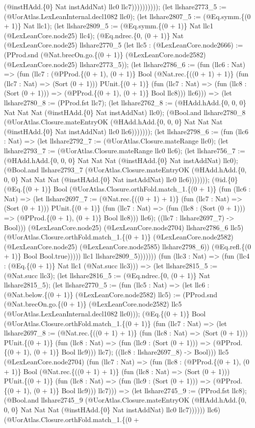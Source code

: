 \documentclass[11pt]{article}
\begin{document}
(@instHAdd.\{0\} Nat instAddNat) llc0 llc7)))))))))); (let llshare2773\_5 := (@UorAtlas.LexLeanInternal.decl1082 llc0); (let llshare2807\_5 := (@Eq.symm.\{(0 + 1)\} Nat llc1); (let llshare2809\_5 := (@Eq.symm.\{(0 + 1)\} Nat llc1 (@LexLeanCore.node25) llc4); (@Eq.ndrec.\{0, (0 + 1)\} Nat (@LexLeanCore.node25) llshare2770\_5 (let llc5 : (@LexLeanCore.node2666) := (PProd.snd (@Nat.brecOn.go.\{(0 + 1)\} (@LexLeanCore.node2582) (@LexLeanCore.node25) llshare2773\_5)); (let llshare2786\_6 := (fun (llc6 : Nat) => (fun (llc7 : (@PProd.\{(0 + 1), (0 + 1)\} Bool (@Nat.rec.\{((0 + 1) + 1)\} (fun (llc7 : Nat) => (Sort (0 + 1))) PUnit.\{(0 + 1)\} (fun (llc7 : Nat) => (fun (llc8 : (Sort (0 + 1))) => (@PProd.\{(0 + 1), (0 + 1)\} Bool llc8))) llc6))) => (let llshare2780\_8 := (PProd.fst llc7); (let llshare2762\_8 := (@HAdd.hAdd.\{0, 0, 0\} Nat Nat Nat (@instHAdd.\{0\} Nat instAddNat) llc0); (@Bool.and llshare2780\_8 (@UorAtlas.Closure.mateEntryOK (@HAdd.hAdd.\{0, 0, 0\} Nat Nat Nat (@instHAdd.\{0\} Nat instAddNat) llc0 llc6))))))); (let llshare2798\_6 := (fun (llc6 : Nat) => (let llshare2792\_7 := (@UorAtlas.Closure.mateRange llc0); (let llshare2793\_7 := (@UorAtlas.Closure.mateRange llc0 llc6); (let llshare756\_7 := (@HAdd.hAdd.\{0, 0, 0\} Nat Nat Nat (@instHAdd.\{0\} Nat instAddNat) llc0); (@Bool.and llshare2793\_7 (@UorAtlas.Closure.mateEntryOK (@HAdd.hAdd.\{0, 0, 0\} Nat Nat Nat (@instHAdd.\{0\} Nat instAddNat) llc0 llc6))))))); (@id.\{0\} (@Eq.\{(0 + 1)\} Bool (@UorAtlas.Closure.orthFold.match\_1.\{(0 + 1)\} (fun (llc6 : Nat) => (let llshare2697\_7 := (@Nat.rec.\{((0 + 1) + 1)\} (fun (llc7 : Nat) => (Sort (0 + 1))) PUnit.\{(0 + 1)\} (fun (llc7 : Nat) => (fun (llc8 : (Sort (0 + 1))) => (@PProd.\{(0 + 1), (0 + 1)\} Bool llc8))) llc6); ((llc7 : llshare2697\_7) -> Bool))) (@LexLeanCore.node25) (@LexLeanCore.node2704) llshare2786\_6 llc5) (@UorAtlas.Closure.orthFold.match\_1.\{(0 + 1)\} (@LexLeanCore.node2582) (@LexLeanCore.node25) (@LexLeanCore.node2585) llshare2798\_6)) (@Eq.refl.\{(0 + 1)\} Bool Bool.true))))) llc1 llshare2809\_5))))))) (fun (llc3 : Nat) => (fun (llc4 : (@Eq.\{(0 + 1)\} Nat llc1 (@Nat.succ llc3))) => (let llshare2815\_5 := (@Nat.succ llc3); (let llshare2816\_5 := (@Eq.ndrec.\{0, (0 + 1)\} Nat llshare2815\_5); (let llshare2770\_5 := (fun (llc5 : Nat) => (let llc6 : (@Nat.below.\{(0 + 1)\} (@LexLeanCore.node2582) llc5) := (PProd.snd (@Nat.brecOn.go.\{(0 + 1)\} (@LexLeanCore.node2582) llc5 (@UorAtlas.LexLeanInternal.decl1082 llc0))); (@Eq.\{(0 + 1)\} Bool (@UorAtlas.Closure.orthFold.match\_1.\{(0 + 1)\} (fun (llc7 : Nat) => (let llshare2697\_8 := (@Nat.rec.\{((0 + 1) + 1)\} (fun (llc8 : Nat) => (Sort (0 + 1))) PUnit.\{(0 + 1)\} (fun (llc8 : Nat) => (fun (llc9 : (Sort (0 + 1))) => (@PProd.\{(0 + 1), (0 + 1)\} Bool llc9))) llc7); ((llc8 : llshare2697\_8) -> Bool))) llc5 (@LexLeanCore.node2704) (fun (llc7 : Nat) => (fun (llc8 : (@PProd.\{(0 + 1), (0 + 1)\} Bool (@Nat.rec.\{((0 + 1) + 1)\} (fun (llc8 : Nat) => (Sort (0 + 1))) PUnit.\{(0 + 1)\} (fun (llc8 : Nat) => (fun (llc9 : (Sort (0 + 1))) => (@PProd.\{(0 + 1), (0 + 1)\} Bool llc9))) llc7))) => (let llshare2745\_9 := (PProd.fst llc8); (@Bool.and llshare2745\_9 (@UorAtlas.Closure.mateEntryOK (@HAdd.hAdd.\{0, 0, 0\} Nat Nat Nat (@instHAdd.\{0\} Nat instAddNat) llc0 llc7)))))) llc6) (@UorAtlas.Closure.orthFold.match\_1.\{(0 + 
\end{document}
